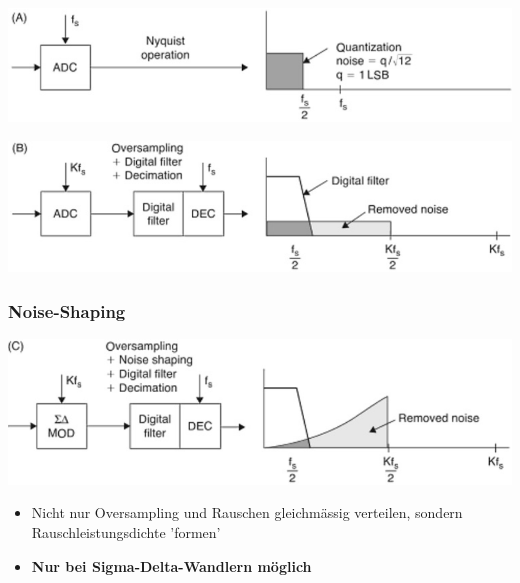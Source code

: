 \begin{minipage}[c]{0.48\columnwidth}
    \includegraphics[width=\columnwidth]{images/rauschen_ohne_oversampling.png}
\end{minipage}
\hfill
\begin{minipage}[c]{0.48\columnwidth}
    \includegraphics[width=\columnwidth]{images/rauschen_mit_oversampling.png}
\end{minipage}


\subsubsection{Noise-Shaping}

\begin{minipage}[c]{0.48\columnwidth}
    \includegraphics[width=\columnwidth]{images/rauschen_mit_oversampling_und_noise_shaping.png}
\end{minipage}
\hfill
\begin{minipage}[c]{0.48\columnwidth}
    \begin{itemize}
        \item Nicht nur Oversampling und Rauschen gleichmässig verteilen, sondern Rauschleistungsdichte 'formen'
        \item \textbf{Nur bei Sigma-Delta-Wandlern möglich}
    \end{itemize}
\end{minipage}


